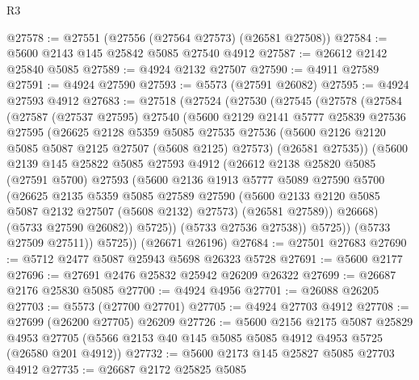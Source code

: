 \begin{lexlean}{R3}
\begin{coremodule}
@27578 := @27551 (@27556 (@27564 @27573) (@26581 @27508))
@27584 := @5600 @2143 @145 @25842 @5085 @27540 @4912
@27587 := @26612 @2142 @25840 @5085
@27589 := @4924 @2132 @27507
@27590 := @4911 @27589
@27591 := @4924 @27590
@27593 := @5573 (@27591 @26082)
@27595 := @4924 @27593 @4912
@27683 := @27518
    (@27524
      (@27530
        (@27545
          (@27578
            (@27584
              (@27587
                (@27537 @27595)
                @27540
                (@5600
                  @2129
                  @2141
                  @5777
                  @25839
                  @27536
                  @27595
                  (@26625
                    @2128
                    @5359
                    @5085
                    @27535
                    @27536
                    (@5600 @2126 @2120 @5085 @5087 @2125 @27507 (@5608 @2125) @27573)
                    (@26581 @27535))
                  (@5600
                    @2139
                    @145
                    @25822
                    @5085
                    @27593
                    @4912
                    (@26612
                      @2138
                      @25820
                      @5085
                      (@27591 @5700)
                      @27593
                      (@5600
                        @2136
                        @1913
                        @5777
                        @5089
                        @27590
                        @5700
                        (@26625
                          @2135
                          @5359
                          @5085
                          @27589
                          @27590
                          (@5600 @2133 @2120 @5085 @5087 @2132 @27507 (@5608 @2132) @27573)
                          (@26581 @27589))
                        @26668)
                      (@5733 @27590 @26082))
                    @5725))
                (@5733 @27536 @27538))
              @5725))
          (@5733 @27509 @27511))
        @5725))
    (@26671 @26196)
@27684 := @27501 @27683
@27690 := @5712 @2477 @5087 @25943 @5698 @26323 @5728
@27691 := @5600 @2177
@27696 := @27691 @2476 @25832 @25942 @26209 @26322
@27699 := @26687 @2176 @25830 @5085
@27700 := @4924 @4956
@27701 := @26088 @26205
@27703 := @5573 (@27700 @27701)
@27705 := @4924 @27703 @4912
@27708 := @27699 (@26200 @27705) @26209
@27726 := @5600
    @2156
    @2175
    @5087
    @25829
    @4953
    @27705
    (@5566 @2153 @40 @145 @5085 @5085 @4912 @4953 @5725 (@26580 @201 @4912))
@27732 := @5600 @2173 @145 @25827 @5085 @27703 @4912
@27735 := @26687 @2172 @25825 @5085

\end{coremodule}
\end{lexlean}
